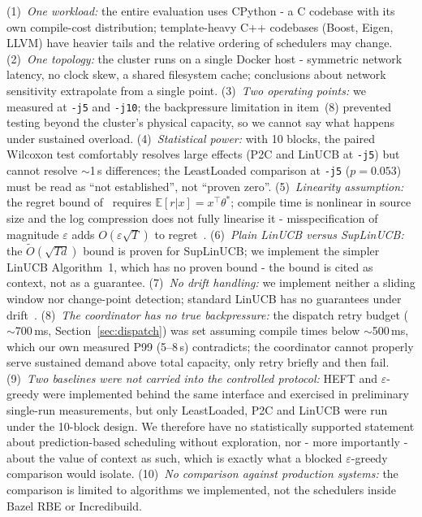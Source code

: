 \documentclass[final,5p,times,twocolumn]{elsarticle}
\begin{document}
(1)~\emph{One workload:} the entire evaluation uses CPython - a C codebase with its own compile-cost distribution; template-heavy C++ codebases (Boost, Eigen, LLVM) have heavier tails and the relative ordering of schedulers may change. (2)~\emph{One topology:} the cluster runs on a single Docker host - symmetric network latency, no clock skew, a shared filesystem cache; conclusions about network sensitivity extrapolate from a single point. (3)~\emph{Two operating points:} we measured at \texttt{-j5} and \texttt{-j10}; the backpressure limitation in item~(8) prevented testing beyond the cluster's physical capacity, so we cannot say what happens under sustained overload. (4)~\emph{Statistical power:} with 10 blocks, the paired Wilcoxon test comfortably resolves large effects (P2C and LinUCB at \texttt{-j5}) but cannot resolve $\sim$1\,s differences; the LeastLoaded comparison at \texttt{-j5} ($p=0.053$) must be read as ``not established'', not ``proven zero''. (5)~\emph{Linearity assumption:} the regret bound of~\cite{chu2011} requires $\mathbb{E}[r|x]=x^\top\theta^*$; compile time is nonlinear in source size and the log compression does not fully linearise it - misspecification of magnitude $\varepsilon$ adds $O(\varepsilon\sqrt{T})$ to regret~\cite{lattimore2020}. (6)~\emph{Plain LinUCB versus SupLinUCB:} the $\tilde{O}(\sqrt{Td})$ bound is proven for SupLinUCB; we implement the simpler LinUCB Algorithm~1, which has no proven bound - the bound is cited as context, not as a guarantee. (7)~\emph{No drift handling:} we implement neither a sliding window nor change-point detection; standard LinUCB has no guarantees under drift~\cite{lattimore2020}. (8)~\emph{The coordinator has no true backpressure:} the dispatch retry budget ($\sim$700\,ms, Section~\ref{sec:dispatch}) was set assuming compile times below $\sim$500\,ms, which our own measured P99 (5--8\,s) contradicts; the coordinator cannot properly serve sustained demand above total capacity, only retry briefly and then fail. (9)~\emph{Two baselines were not carried into the controlled protocol:} HEFT and $\varepsilon$-greedy were implemented behind the same interface and exercised in preliminary single-run measurements, but only LeastLoaded, P2C and LinUCB were run under the 10-block design. We therefore have no statistically supported statement about prediction-based scheduling without exploration, nor - more importantly - about the value of context as such, which is exactly what a blocked $\varepsilon$-greedy comparison would isolate. (10)~\emph{No comparison against production systems:} the comparison is limited to algorithms we implemented, not the schedulers inside Bazel RBE or Incredibuild.
\end{document}
